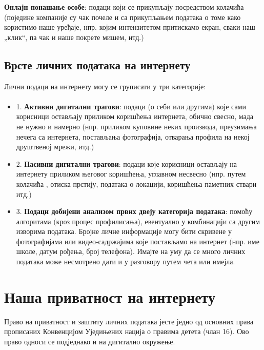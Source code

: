 \documentclass[a4paper]{article}
\begin{document}
\textbf{Онлајн понашање особе}: подаци који се прикупљају посредством колачића (поједине компаније су чак почеле и са прикупљањем података о томе како користимо наше уређаје, нпр. којим интензитетом притискамо екран, сваки наш „клик“, па чак и наше покрете мишем, итд.)
\subsection{Врсте личних података на интернету}

Лични подаци на интернету могу се груписати у три категорије:

\paragraph{}
\begin{itemize}


\item    1. \textbf{Активни дигитални трагови}: подаци (о себи или другима) које сами корисници остављају приликом коришћења интернета, обично свесно, мада не нужно и намерно  (нпр. приликом куповине неких производа, преузимања нечега са интернета, постављања фотографија, отварања профила на некој друштвеној мрежи, итд.)
    
\item    2. \textbf{Пасивни дигитални трагови}: подаци које корисници остављају на интернету приликом његовог коришћења, углавном несвесно (нпр. путем колачића , отиска прстију, података о локацији, коришћења паметних ствари итд.)
    
\item    3. \textbf{Подаци добијени анализом првих двеју категорија података}: помоћу алгоритама  (кроз процес профилисања), евентуално у комбинацији са другим изворима података.
Бројне личне информације могу бити скривене у фотографијама или видео-садржајима које постављамо на интернет (нпр. име школе, датум рођења, број телефона). Имајте на уму да се много личних података може несмотрено дати и у разговору путем чета или имејла.
\end{itemize}
\section{Наша приватност на интернету}

Право на приватност и заштиту личних података јесте једно од основних права прописаних Конвенцијом Уједињених нација о правима детета (члан 16). Ово право односи се подједнако и на дигитално окружење.
\end{document}
